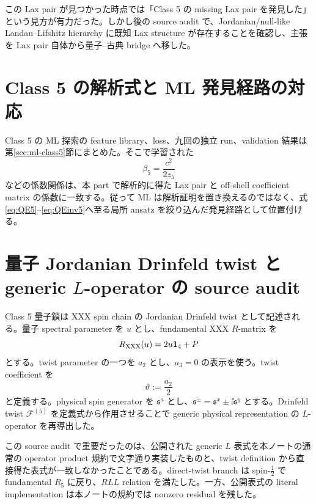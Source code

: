 \begin{historymemo}
この Lax pair が見つかった時点では「Class 5 の missing Lax pair を発見した」という見方が有力だった。しかし後の source audit で、Jordanian/null-like Landau--Lifshitz hierarchy に既知 Lax structure が存在することを確認し、主張を Lax pair 自体から量子--古典 bridge へ移した。
\end{historymemo}

\section{Class 5 の解析式と ML 発見経路の対応}
Class 5 の ML 探索の feature library、loss、九回の独立 run、validation 結果は第\ref{sec:ml-class5}節にまとめた。そこで学習された
\begin{equation}
\beta_5=\frac{c^2}{2z_5}
\end{equation}
などの係数関係は、本 part で解析的に得た Lax pair と off-shell coefficient matrix の係数に一致する。従って ML は解析証明を置き換えるのではなく、式\eqref{eq:QE5}--\eqref{eq:QEinv5}へ至る局所 ansatz を絞り込んだ発見経路として位置付ける。

\section{量子 Jordanian Drinfeld twist と generic $L$-operator の source audit}
Class 5 量子鎖は XXX spin chain の Jordanian Drinfeld twist として記述される\cite{DFN2026}。量子 spectral parameter を $u$ とし、fundamental XXX $R$-matrix を
\begin{equation}
R_{\rm XXX}(u)=2u\mathbf 1_{4}+P
\label{eq:Rxxx}
\end{equation}
とする。twist parameter の一つを $a_2$ とし、$a_3=0$ の表示を使う。twist coefficient を
\begin{equation}
\vartheta:=\frac{a_2}{2}
\end{equation}
と定義する。physical spin generator を $\mathfrak s^a$ とし、$\mathfrak s^\pm=\mathfrak s^x\pm\ii\mathfrak s^y$ とする。Drinfeld twist $\mathcal F^{(5)}$ を定義式から作用させることで generic physical representation の $L$-operator を再導出した。

この source audit で重要だったのは、公開された generic $L$ 表式を本ノートの通常の operator product 規約で文字通り実装したものと、twist definition から直接得た表式が一致しなかったことである。direct-twist branch は spin-$\tfrac12$ で fundamental $R_5$ に戻り、$RLL$ relation を満たした。一方、公開表式の literal implementation は本ノートの規約では nonzero residual を残した。

